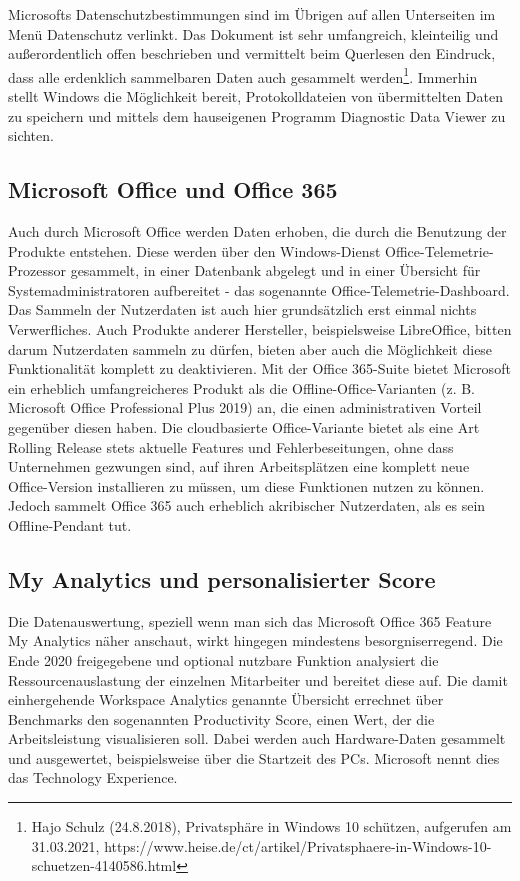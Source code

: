 Microsofts Datenschutzbestimmungen sind im Übrigen auf allen Unterseiten im Menü \glqq Datenschutz\grqq{} verlinkt. Das Dokument ist sehr umfangreich, kleinteilig und außerordentlich offen beschrieben und vermittelt beim Querlesen den Eindruck, dass alle erdenklich sammelbaren Daten auch gesammelt werden\footnote{Hajo Schulz (24.8.2018), Privatsphäre in Windows 10 schützen, aufgerufen am 31.03.2021, https://www.heise.de/ct/artikel/Privatsphaere-in-Windows-10-schuetzen-4140586.html}. Immerhin stellt Windows die Möglichkeit bereit, Protokolldateien von übermittelten Daten zu speichern und mittels dem hauseigenen Programm \glqq Diagnostic Data Viewer\grqq{} zu sichten.

\subsection{Microsoft Office und Office 365}
Auch durch Microsoft Office werden Daten erhoben, die durch die Benutzung der Produkte entstehen. Diese werden über den Windows-Dienst \glqq Office-Telemetrie-Prozessor\grqq{} gesammelt, in einer Datenbank abgelegt und in einer Übersicht für Systemadministratoren aufbereitet - das sogenannte \glqq Office-Telemetrie-Dashboard\grqq{}.\\
Das Sammeln der Nutzerdaten ist auch hier grundsätzlich erst einmal nichts Verwerfliches. Auch Produkte anderer Hersteller, beispielsweise LibreOffice, bitten darum Nutzerdaten sammeln zu dürfen, bieten aber auch die Möglichkeit diese Funktionalität komplett zu deaktivieren. Mit der \glqq Office 365\grqq{}-Suite bietet Microsoft ein erheblich umfangreicheres Produkt als die Offline-Office-Varianten (z. B. Microsoft Office Professional Plus 2019) an, die einen administrativen Vorteil gegenüber diesen haben. Die cloudbasierte Office-Variante bietet als eine Art \glqq Rolling Release\grqq{} stets aktuelle Features und Fehlerbeseitungen, ohne dass Unternehmen gezwungen sind, auf ihren Arbeitsplätzen eine komplett neue Office-Version installieren zu müssen, um diese Funktionen nutzen zu können. Jedoch sammelt Office 365 auch erheblich akribischer Nutzerdaten, als es sein Offline-Pendant tut.

\subsection{My Analytics und personalisierter Score}
Die Datenauswertung, speziell wenn man sich das Microsoft Office 365 Feature \glqq My Analytics\grqq{} näher anschaut, wirkt hingegen mindestens besorgniserregend. Die Ende 2020 freigegebene und optional nutzbare Funktion analysiert die Ressourcenauslastung der einzelnen Mitarbeiter und bereitet diese auf. Die damit einhergehende \glqq Workspace Analytics\grqq{} genannte Übersicht errechnet über Benchmarks den sogenannten \glqq Productivity Score\grqq{}, einen Wert, der die Arbeitsleistung visualisieren soll. Dabei werden auch Hardware-Daten gesammelt und ausgewertet, beispielsweise über die Startzeit des PCs. Microsoft nennt dies das \glqq Technology Experience\grqq{}.\\

